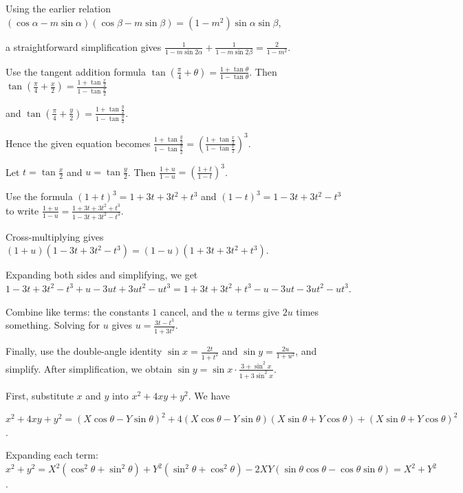   Using the earlier relation
  $( \cos\alpha - m \sin\alpha )( \cos\beta - m \sin\beta ) = ( 1 - m^2 ) \sin\alpha \sin\beta$,

  a straightforward simplification gives
  $\frac{1}{1 - m \sin 2\alpha} + \frac{1}{1 - m \sin 2\beta} = \frac{2}{1 - m^2}$.
\item Use the tangent addition formula $\tan\left(\frac{\pi}{4} + \theta\right) = \frac{1 + \tan\theta}{1
  - \tan\theta}$. Then $\tan\left(\frac{\pi}{4} + \frac{x}{2}\right) = \frac{1 + \tan\frac{x}{2}}{1
  - \tan\frac{x}{2}}$

  and $\tan\left(\frac{\pi}{4} + \frac{y}{2}\right) = \frac{1 + \tan\frac{y}{2}}{1 - \tan\frac{y}{2}}$.

  Hence the given equation becomes $\frac{1 + \tan\frac{y}{2}}{1 - \tan\frac{y}{2}} = \left( \frac{1
    + \tan\frac{x}{2}}{1 - \tan\frac{x}{2}} \right)^3$.

  Let $t = \tan\frac{x}{2}$ and $u = \tan\frac{y}{2}$. Then $\frac{1 + u}{1 - u} = \left( \frac{1 + t}{1 -
    t} \right)^3$.

  Use the formula $(1 + t)^3 = 1 + 3t + 3t^2 + t^3$ and $(1 - t)^3 = 1 - 3t + 3t^2 - t^3$ to write
  $\frac{1 + u}{1 - u} = \frac{1 + 3t + 3t^2 + t^3}{1 - 3t + 3t^2 - t^3}$.

  Cross-multiplying gives $(1 + u)(1 - 3t + 3t^2 - t^3) = (1 - u)(1 + 3t + 3t^2 + t^3)$.

  Expanding both sides and simplifying, we get $1 - 3t + 3t^2 - t^3 + u - 3ut + 3ut^2 - ut^3 = 1 + 3t + 3t^2
  + t^3 - u - 3ut - 3ut^2 - ut^3$.

  Combine like terms: the constants $1$ cancel, and the $u$ terms give $2u$ times something. Solving for $u$
  gives $u = \frac{3t - t^3}{1 + 3t^2}$.

  Finally, use the double-angle identity $\sin x = \frac{2t}{1 + t^2}$ and $\sin y = \frac{2u}{1 + u^2}$,
  and simplify. After simplification, we obtain
  $\sin y = \sin x \cdot \frac{3 + \sin^2 x}{1 + 3 \sin^2 x}$.
\item First, substitute $x$ and $y$ into $x^2 + 4xy + y^2$. We have

  $x^2 + 4xy + y^2 = (X \cos\theta - Y \sin\theta)^2 + 4 (X \cos\theta - Y \sin\theta)(X \sin\theta +
  Y \cos\theta) + (X \sin\theta + Y \cos\theta)^2$.

  Expanding each term: $x^2 + y^2 = X^2 (\cos^2\theta + \sin^2\theta) + Y^2 (\sin^2\theta + \cos^2\theta) -
  2XY (\sin\theta \cos\theta - \cos\theta \sin\theta) = X^2 + Y^2$.

